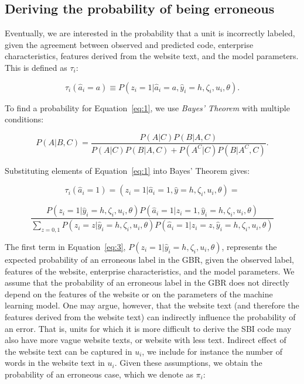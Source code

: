 \documentclass[12pt, a4paper, titlepage]{article}
\begin{document}
					\subsection{Deriving the probability of being erroneous}
					\label{section:probs}

Eventually, we are interested in the probability that a unit is incorrectly labeled, given the agreement between observed and predicted code, enterprise characteristics, features derived from the website text, and the model parameters. This is defined as $\tau_i$:

						\begin{equation} \label{eq:1}
\tau_i(\hat{a}_i = a) \equiv P(z_i = 1 | \hat{a}_i = a, \hat{y}_i = h, \zeta_i, u_i, \theta).
						\end{equation}

To find a probability for Equation~\ref{eq:1}, we use \textit{Bayes' Theorem} with multiple conditions:

						\begin{equation*} \label{eq:bayes}
P(A | B, C) =  \frac{P(A | C) P(B | A, C)}{P(A|C)P(B|A,C) + P(A^C|C)P(B|A^C, C)}   .
						\end{equation*}

Substituting elements of Equation~\ref{eq:1} into Bayes' Theorem gives: 

						\begin{equation}\label{eq:2}
\tau_i(\hat{a}_i = 1) = (z_i = 1 | \hat{a}_i = 1, \hat{y} = h, \zeta_i, u_i, \theta) = 
						\end{equation}

						\begin{equation}\label{eq:3}
\frac{P(z_i = 1|\hat{y}_i = h, \zeta_i, u_i, \theta)P(\hat{a}_i=1|z_i=1, \hat{y}_i = h, \zeta_i, u_i, \theta) }
{\sum_{z=0,1}P(z_i=z|\hat{y}_i = h, \zeta_i, u_i, \theta) P( \hat{a}_i=1|z_i=z, \hat{y}_i = h, \zeta_i, u_i, \theta  )} 
						\end{equation}


The first term in Equation~\ref{eq:3}, $P(z_i = 1|\hat{y}_i = h, \zeta_i, u_i, \theta)$, represents the expected probability of an erroneous label in the GBR, given the observed label, features of the website, enterprise characteristics, and the model parameters. We assume that the probability of an erroneous label in the GBR does not directly depend on the features of the website or on the parameters of the machine learning model. One may argue, however, that the website text (and therefore the features derived from the website text) can indirectly influence the probability of an error. That is, units for which it is more difficult to derive the SBI code may also have more vague website texts, or website with less text. Indirect effect of the website text can be captured in $u_i$, we include for instance the number of words in the website text in $u_i$. Given these assumptions, we obtain the probability of an erroneous case, which we denote as $\pi_i$:
\end{document}
